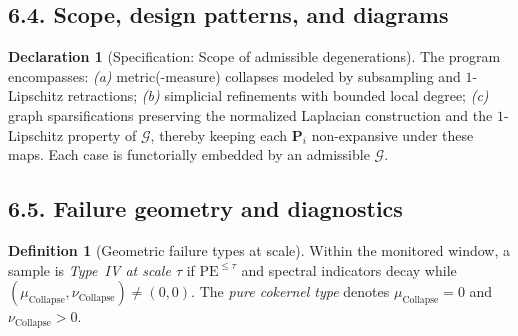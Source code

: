 \documentclass[11pt]{article}
\DeclareMathOperator{\Ext}{Ext}
\DeclareRobustCommand{\hyp}{\nobreakdash-}
\newcommand{\Rfun}{\mathcal{R}}
\numberwithin{equation}{section}
\theoremstyle{definition}
\newtheorem{definition}[theorem]{Definition}
\newtheorem{declaration}[theorem]{Declaration}
\DeclareRobustCommand{\FiltCh}[1]{\mathsf{FiltCh}(#1)}
\DeclareRobustCommand{\Ttau}{\texorpdfstring{\ensuremath{\mathbf{T}_{\tau}}}{T\_\tau}}
\DeclareRobustCommand{\Ctau}{\texorpdfstring{\ensuremath{C_{\tau}}}{C\_\tau}}
\DeclareRobustCommand{\muc}{\mu_{\mathrm{Collapse}}}
\DeclareRobustCommand{\nuc}{\nu_{\mathrm{Collapse}}}
\DeclareRobustCommand{\LC}{\texorpdfstring{\ensuremath{\mathrm{(LC)}}}{(LC)}}
\providecommand{\n}{\unskip\space}
\begin{document}
\subsection*{6.4. Scope, design patterns, and diagrams}
\begin{declaration}[Specification: Scope of admissible degenerations]\label{spec:scope}
The program encompasses: \emph{(a)} metric(\hyp measure) collapses modeled by subsampling and \(1\)\hyp Lipschitz retractions; \emph{(b)} simplicial refinements with bounded local degree; \emph{(c)} graph sparsifications preserving the normalized Laplacian construction and the \(1\)\hyp Lipschitz property of \(\mathcal{G}\), thereby keeping each \(\mathbf{P}_i\) non\hyp expansive under these maps.
Each case is functorially embedded by an admissible \(\mathcal{G}\).
\end{declaration}

\begin{center}
\end{center}

\subsection*{6.5. Failure geometry and diagnostics}
\begin{definition}[Geometric failure types at scale]\label{def:geom-failure}
Within the monitored window, a sample is \emph{Type~IV at scale \(\tau\)} if \(\mathrm{PE}^{\le\tau}\) and spectral indicators decay while \((\muc,\nuc)\neq(0,0)\).
The \emph{pure cokernel type} denotes \(\muc=0\) and \(\nuc>0\).
\end{definition}
\end{document}
